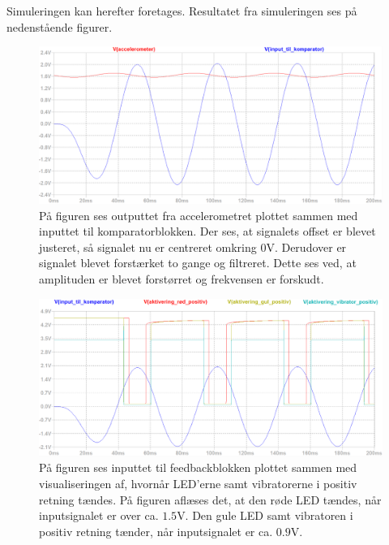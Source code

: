 \noindent Simuleringen kan herefter foretages. Resultatet fra simuleringen ses på nedenstående figurer.
\begin{figure}[H]
	\centering
	\includegraphics[scale=.3]{figures/cProblemloesning/Samlet_system_sim12.PNG}
	\caption{På figuren ses outputtet fra accelerometret plottet sammen med inputtet til komparatorblokken. Der ses, at signalets offset er blevet justeret, så signalet nu er centreret omkring 0V. Derudover er signalet blevet forstærket to gange og filtreret. Dette ses ved, at amplituden er blevet forstørret og frekvensen er forskudt.}
	\label{fig:samlet_system_sim1}
\end{figure}
\begin{figure}[H]
	\centering
	\includegraphics[scale=.38]{figures/cProblemloesning/Samlet_system_sim3.PNG}
	\caption{På figuren ses inputtet til feedbackblokken plottet sammen med visualiseringen af, hvornår LED'erne samt vibratorerne i positiv retning tændes. På figuren aflæses det, at den røde LED tændes, når inputsignalet er over ca. $1.5$V. Den gule LED samt vibratoren i positiv retning tænder, når inputsignalet er ca. $0.9$V.}
	\label{fig:samlet_system_sim2}
\end{figure}
